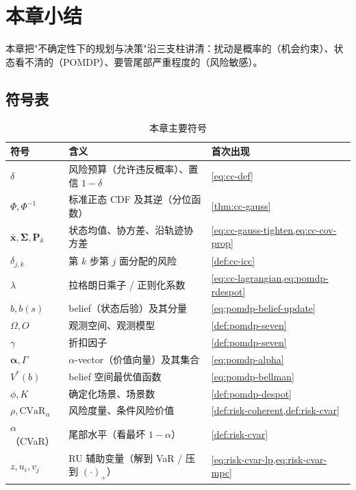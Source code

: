 \section*{本章小结}
\label{sec:plan-chance-summary}

本章把"不确定性下的规划与决策"沿三支柱讲清：扰动是概率的（机会约束）、状态看不清的（POMDP）、要管尾部严重程度的（风险敏感）。

\subsection*{符号表}
\begin{table}[H]\centering\small
\caption{本章主要符号}
\label{tab:plan-chance-symbols}
\begin{tabular}{lll}
\toprule
符号 & 含义 & 首次出现 \\
\midrule
$\delta$ & 风险预算（允许违反概率）、置信 $1-\delta$ & \cref{eq:cc-def} \\
$\Phi,\Phi^{-1}$ & 标准正态 CDF 及其逆（分位函数）& \cref{thm:cc-gauss} \\
$\bar{\mathbf{x}},\boldsymbol{\Sigma},\mathbf{P}_k$ & 状态均值、协方差、沿轨迹协方差 & \cref{eq:cc-gauss-tighten,eq:cc-cov-prop} \\
$\delta_{j,k}$ & 第 $k$ 步第 $j$ 面分配的风险 & \cref{def:cc-icc} \\
$\lambda$ & 拉格朗日乘子 / 正则化系数 & \cref{eq:cc-lagrangian,eq:pomdp-rdespot} \\
$b,b(s)$ & belief（状态后验）及其分量 & \cref{eq:pomdp-belief-update} \\
$\Omega,O$ & 观测空间、观测模型 & \cref{def:pomdp-seven} \\
$\gamma$ & 折扣因子 & \cref{def:pomdp-seven} \\
$\boldsymbol{\alpha},\Gamma$ & $\alpha$-vector（价值向量）及其集合 & \cref{eq:pomdp-alpha} \\
$V^*(b)$ & belief 空间最优值函数 & \cref{eq:pomdp-bellman} \\
$\phi,K$ & 确定化场景、场景数 & \cref{def:pomdp-despot} \\
$\rho,\mathrm{CVaR}_\alpha$ & 风险度量、条件风险价值 & \cref{def:risk-coherent,def:risk-cvar} \\
$\alpha$（CVaR）& 尾部水平（看最坏 $1-\alpha$）& \cref{def:risk-cvar} \\
$z,u_i,v_j$ & RU 辅助变量（解到 VaR / 压到 $(\cdot)_+$）& \cref{eq:risk-cvar-lp,eq:risk-cvar-mpc} \\
\bottomrule
\end{tabular}
\end{table}

